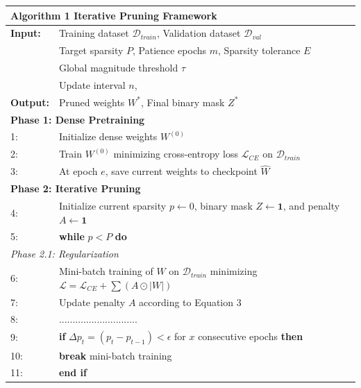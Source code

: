 \begin{table}[H]
    \centering
    \renewcommand{\arraystretch}{1}
    \begin{tabular}{@{}ll@{}}
        \toprule
        \multicolumn{2}{l}{\textbf{Algorithm 1} Iterative Pruning Framework} \\
        \midrule
        \textbf{Input:}  & Training dataset $\mathcal{D}_{train}$, Validation dataset $\mathcal{D}_{val}$ \\
                         & Target sparsity $P$, Patience epochs $m$, Sparsity tolerance $E$ \\
                         & Global magnitude threshold $\tau$ \\
                         & Update interval $n$, \\
        \textbf{Output:} & Pruned weights $W^*$, Final binary mask $Z^*$ \\
        \midrule
        \multicolumn{2}{l}{\textbf{Phase 1: Dense Pretraining}} \\
        1: & Initialize dense weights $W^{(0)}$ \\
        2: & Train $W^{(0)}$ minimizing cross-entropy loss $\mathcal{L}_{CE}$ on $\mathcal{D}_{train}$ \\
        3: & At epoch $e$, save current weights to checkpoint $\hat{W}$ \\
        \midrule
        \multicolumn{2}{l}{\textbf{Phase 2: Iterative Pruning}} \\
        4: & Initialize current sparsity $p \gets 0$, binary mask $Z \gets \mathbf{1}$, and penalty $A \gets \mathbf{1}$ \\
        5: & \textbf{while} $p < P$ \textbf{do} \\
        \multicolumn{2}{l}{\quad \textit{Phase 2.1: Regularization}} \\
        6: & \quad Mini-batch training of $W$ on $\mathcal{D}_{train}$ minimizing $\mathcal{L} = \mathcal{L}_{CE} + \sum (A \odot \lvert W \rvert)$ \\
        7: & \quad Update penalty $A$ according to Equation 3 \\
        8: & \quad ............................. \\
        9: & \quad \textbf{if} $\Delta p_t = (p_t - p_{t-1}) < \epsilon$ for $x$ consecutive epochs \textbf{then} \\
        10:& \quad \quad \textbf{break} mini-batch training \\
        11:& \quad \textbf{end if} \\

\end{tabular}
\end{table}
